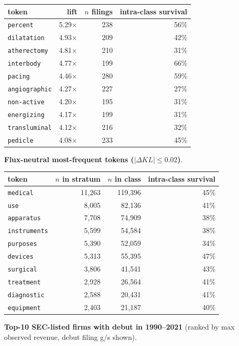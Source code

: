 \begin{tabular}{lrrr}
\toprule
token & lift & $n$ filings & intra-class survival \\
\midrule
\texttt{percent} & 5.29$\times$ & 238 & 56\% \\
\texttt{dilatation} & 4.93$\times$ & 209 & 42\% \\
\texttt{atherectomy} & 4.81$\times$ & 210 & 31\% \\
\texttt{interbody} & 4.77$\times$ & 199 & 66\% \\
\texttt{pacing} & 4.46$\times$ & 280 & 59\% \\
\texttt{angiographic} & 4.27$\times$ & 227 & 27\% \\
\texttt{non-active} & 4.20$\times$ & 195 & 31\% \\
\texttt{energizing} & 4.17$\times$ & 199 & 31\% \\
\texttt{transluminal} & 4.12$\times$ & 216 & 32\% \\
\texttt{pedicle} & 4.08$\times$ & 233 & 45\% \\
\bottomrule
\end{tabular}

\textbf{Flux-neutral most-frequent tokens ($|\Delta KL|\leq 0.02$)}.

\begin{tabular}{lrrr}
\toprule
token & $n$ in stratum & $n$ in class & intra-class survival \\
\midrule
\texttt{medical} & 11,263 & 119,396 & 45\% \\
\texttt{use} & 8,005 & 82,136 & 41\% \\
\texttt{apparatus} & 7,708 & 74,909 & 38\% \\
\texttt{instruments} & 5,599 & 54,584 & 38\% \\
\texttt{purposes} & 5,390 & 52,059 & 34\% \\
\texttt{devices} & 5,313 & 55,395 & 47\% \\
\texttt{surgical} & 3,806 & 41,541 & 43\% \\
\texttt{treatment} & 2,928 & 26,564 & 41\% \\
\texttt{diagnostic} & 2,588 & 20,431 & 41\% \\
\texttt{equipment} & 2,403 & 21,187 & 40\% \\
\bottomrule
\end{tabular}

\textbf{Top-10 SEC-listed firms with debut in 1990--2021} (ranked by max observed revenue, debut filing g/s shown).

